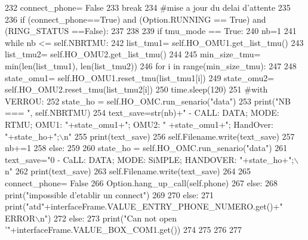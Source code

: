 \begin{DoxyCode}
232                         connect\_phone= \textcolor{keyword}{False}
233                         \textcolor{keywordflow}{break}
234                     \textcolor{comment}{#mise a jour du delai d'attente
}
235 
236                 \textcolor{keywordflow}{if} (connect\_phone==\textcolor{keyword}{True}) \textcolor{keywordflow}{and} (Option.RUNNING == \textcolor{keyword}{True}) \textcolor{keywordflow}{and} (RING\_STATUS ==\textcolor{keyword}{False}):
237                     
238                     
239                     \textcolor{keywordflow}{if} tmu\_mode == \textcolor{keyword}{True}:
240                         nb=1
241                         \textcolor{keywordflow}{while} nb <= self.NBRTMU:
242                             list\_tmu1= self.HO\_OMU1.get\_list\_tmu()
243                             list\_tmu2= self.HO\_OMU2.get\_list\_tmu()
244 
245                             min\_size\_tmu= min(len(list\_tmu1), len(list\_tmu2))
246                             \textcolor{keywordflow}{for} i \textcolor{keywordflow}{in} range(min\_size\_tmu):
247                                 
248                                 state\_omu1= self.HO\_OMU1.reset\_tmu(list\_tmu1[i])
249                                 state\_omu2= self.HO\_OMU2.reset\_tmu(list\_tmu2[i])
250                                 time.sleep(120)
251                                 \textcolor{comment}{#with VERROU:
}
252                                 state\_ho = self.HO\_OMC.run\_senario(\textcolor{stringliteral}{"data"})
253                                 print(\textcolor{stringliteral}{"NB === "}, self.NBRTMU)
254                                 text\_save=str(nb)+\textcolor{stringliteral}{" - CALL: DATA; MODE: RTMU; OMU1: "}+state\_omu1+\textcolor{stringliteral}{"; OMU2: "}
      +state\_omu1+\textcolor{stringliteral}{"; HandOver: "}+state\_ho+\textcolor{stringliteral}{";\(\backslash\)n"}                                
255                                 print(text\_save)
256                                 self.Filename.write(text\_save)
257                             nb+=1
258                     \textcolor{keywordflow}{else}:
259 
260                         state\_ho = self.HO\_OMC.run\_senario(\textcolor{stringliteral}{"data"})
261                         text\_save=\textcolor{stringliteral}{"0 - CaLL: DATA; MODE: SiMPLE; HANDOVER: "}+state\_ho+\textcolor{stringliteral}{";\(\backslash\)n"}
262                         print(text\_save)
263                         self.Filename.write(text\_save)
264 
265                     connect\_phone= \textcolor{keyword}{False}
266                     Option.hang\_up\_call(self.phone)
267                 \textcolor{keywordflow}{else}:
268                     print(\textcolor{stringliteral}{"impossible d'etablir un connect"})
269 
270             \textcolor{keywordflow}{else}:
271                 print(\textcolor{stringliteral}{"atd"}+interfaceFrame.VALUE\_ENTRY\_PHONE\_NUMERO.get()+\textcolor{stringliteral}{" ERROR\(\backslash\)n"})
272         \textcolor{keywordflow}{else}:
273             print(\textcolor{stringliteral}{"Can not open '"}+interfaceFrame.VALUE\_BOX\_COM1.get())
274 
275 
276 
277 
\end{DoxyCode}
